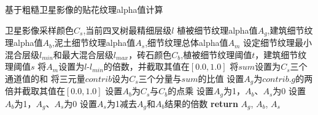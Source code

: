 \begin{algorithm}[h]
	\renewcommand{\algorithmicrequire}{\textbf{Input:}}
	\renewcommand{\algorithmicensure}{\textbf{Output:}}
	\caption{基于粗糙卫星影像的贴花纹理alpha值计算}
	\label{alg:1}
	\begin{algorithmic}[1]
		\REQUIRE 卫星影像采样颜色$C_s$,当前四叉树最精细层级$l$
		\ENSURE 植被细节纹理alpha值$A_g$,建筑细节纹理alpha值$A_b$,泥土细节纹理alpha值$A_s$,细节纹理总体alpha值$A_m$
		\STATE 设定细节纹理最小混合层级$l_{min}$和最大混合层级$l_{max}$，砖石颜色$C_b$,植被细节纹理阈值$t$，建筑细节纹理阈值$s$
		\STATE 将$A_m$设置为$l$-$l_{min}$的倍数，并截取其值在$[0.0,1.0]$
		\STATE 将$sum$设置为$C_s$三个通道值的和
		\STATE 将三元量$contrib$设为$C_s$三个分量与$sum$的比值
		\STATE 设置$A_g$为$contrib.g$的两倍并截取其值在$[0.0,1.0]$
		\STATE 设置$A_b$为$C_s$与$C_b$的点乘
	    \STATE 设置$A_g$为1，$A_b$、$A_s$为0
	    \STATE 设置$A_b$为1，$A_g$、$A_s$为0
	    \ELSE 
	    \STATE 设置$A_s$为1减去$A_g$和$A_b$结果的倍数
		\ENDIF
		\STATE \textbf{return} $A_g$, $A_b$, $A_s$
	\end{algorithmic}  
\end{algorithm}
